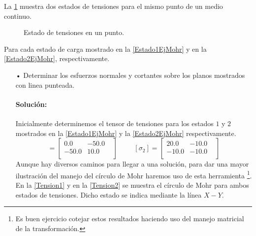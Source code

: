 \documentclass[../notas medios.tex]{subfiles}
\begin{document}
La \cref{planosEjMohr} muestra dos estados de tensiones para el mismo punto de
un medio continuo. 
%
\begin{figure}[H]
	\centering
		\hspace{0.5cm}
	\caption{Estado de tensiones en un punto. }
	\label{planosEjMohr}
\end{figure}
%
Para cada estado de carga mostrado en la  \cref{Estado1EjMohr} y en la  \cref{Estado2EjMohr}, respectivamente.
\begin{enumerate}
%
\item[•] Determinar los esfuerzos normales y cortantes sobre los planos mostrados con linea punteada. \\\\
%
\textbf{Solución:}\\\\
%
Inicialmente determinemos el tensor de tensiones para los estados $1$ y $2$
mostrados en la \cref{Estado1EjMohr} y la \cref{Estado2EjMohr} respectivamente.
%
\begin{equation*}
[\sigma_1] =
 	\begin{bmatrix}
     	0.0 & -50.0 & \\
     	-50.0 & 10.0 \\
 	\end{bmatrix}
 \hspace{1cm}
 [\sigma_2] =
 	\begin{bmatrix}
     	20.0 & -10.0 & \\
     	-10.0 & -10.0 \\
 	\end{bmatrix}
\end{equation*}
%
Aunque hay diversos caminos para llegar a una solución, para dar una mayor
ilustración del manejo del círculo de  Mohr haremos uso de esta herramienta
\footnote{Es buen ejercicio cotejar estos resultados haciendo uso del manejo
matricial de la transformación.}. En la  \cref{Tension1} y  en la \cref{Tension2}
se muestra el círculo de Mohr para ambos estados de tensiones. Dicho estado se indica mediante la línea $X-Y$.
%
\begin{figure}[H]
	\centering
		\hspace{0.5cm}

\end{figure}
\end{enumerate}
\end{document}
